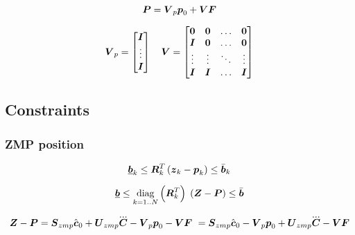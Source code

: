 \begin{equation*}
    \mbox{\boldmath $P$} = \mbox{\boldmath $V$}_p \mbox{\boldmath $p$}_0 + \mbox{\boldmath $V$} \mbox{\boldmath $F$}
\end{equation*}

\begin{equation*}
    \mbox{\boldmath $V$}_p = 
    \begin{bmatrix}
        \mbox{\boldmath $I$}\\
        \vdots\\
        \mbox{\boldmath $I$}\\
    \end{bmatrix}
    \quad
    \mbox{\boldmath $V$} = 
    \begin{bmatrix}
        \mbox{\boldmath $0$}   &   \mbox{\boldmath $0$}   & \dots     & \mbox{\boldmath $0$} \\
        \mbox{\boldmath $I$}   &   \mbox{\boldmath $0$}   & \dots     & \mbox{\boldmath $0$} \\
        \vdots  &   \vdots  & \ddots    & \vdots \\
        \mbox{\boldmath $I$}   &   \mbox{\boldmath $I$}   & \dots     & \mbox{\boldmath $I$} \\
    \end{bmatrix}
\end{equation*}



\subsection{Constraints}

\subsubsection{ZMP position}
\begin{equation*}
    \underline{\mbox{\boldmath $b$}}_k \le \mbox{\boldmath $R$}_k^T \left( \mbox{\boldmath $z$}_k - \mbox{\boldmath $p$}_k \right) \le \bar{\mbox{\boldmath $b$}}_k\\
\end{equation*}

\begin{equation*}
    \underbar{\mbox{\boldmath $b$}} 
    \le 
    \underset{k = 1..N}{\operatorname{diag}}\left(\mbox{\boldmath $R$}_k^T\right)\;
    \left(
        \mbox{\boldmath $Z$}
        -
        \mbox{\boldmath $P$}
    \right) 
    \le
    \bar{\mbox{\boldmath $b$}}
\end{equation*}


\begin{equation*}
    \ZMP - \FP 
    =
    \M{S}_{zmp} \cstate_0  +  \M{U}_{zmp} \cJerk - \M{V}_p \fp_0 - \M{V} \FD\
    =
    \M{S}_{zmp} \cstate_0 - \M{V}_p \fp_0
    +
    \M{U}_{zmp} \cJerk - \M{V} \FD
\end{equation*}

